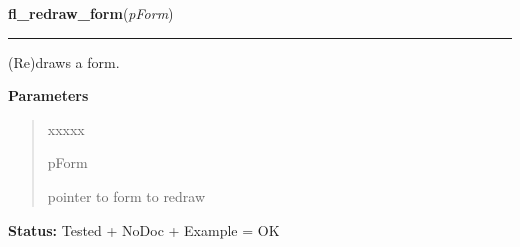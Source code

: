     \label{xformslib:library:fl_redraw_form}

    \vspace{0.5ex}

\hspace{.8\funcindent}\begin{boxedminipage}{\funcwidth}

    \raggedright \textbf{fl\_redraw\_form}(\textit{pForm})

    \vspace{-1.5ex}

    \rule{\textwidth}{0.5\fboxrule}
\setlength{\parskip}{2ex}
    (Re)draws a form.

\setlength{\parskip}{1ex}
      \textbf{Parameters}
      \vspace{-1ex}

      \begin{quote}
        \begin{Ventry}{xxxxx}

          \item[pForm]

          pointer to form to redraw

        \end{Ventry}

      \end{quote}

\textbf{Status:} Tested + NoDoc + Example = OK



    \end{boxedminipage}

    \label{xformslib:library:fl_set_form_dblbuffer}

    \vspace{0.5ex}

